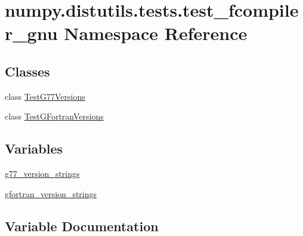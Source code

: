 \hypertarget{namespacenumpy_1_1distutils_1_1tests_1_1test__fcompiler__gnu}{}\section{numpy.\+distutils.\+tests.\+test\+\_\+fcompiler\+\_\+gnu Namespace Reference}
\label{namespacenumpy_1_1distutils_1_1tests_1_1test__fcompiler__gnu}
\subsection*{Classes}
\begin{DoxyCompactItemize}
\item 
class \hyperlink{classnumpy_1_1distutils_1_1tests_1_1test__fcompiler__gnu_1_1TestG77Versions}{Test\+G77\+Versions}
\item 
class \hyperlink{classnumpy_1_1distutils_1_1tests_1_1test__fcompiler__gnu_1_1TestGFortranVersions}{Test\+G\+Fortran\+Versions}
\end{DoxyCompactItemize}
\subsection*{Variables}
\begin{DoxyCompactItemize}
\item 
\hyperlink{namespacenumpy_1_1distutils_1_1tests_1_1test__fcompiler__gnu_a71e6c43345afe2c9904f27861051f51b}{g77\+\_\+version\+\_\+strings}
\item 
\hyperlink{namespacenumpy_1_1distutils_1_1tests_1_1test__fcompiler__gnu_a179eafc5d1f6c955447553370d2707e7}{gfortran\+\_\+version\+\_\+strings}
\end{DoxyCompactItemize}


\subsection{Variable Documentation}
\mbox{\label{namespacenumpy_1_1distutils_1_1tests_1_1test__fcompiler__gnu_a71e6c43345afe2c9904f27861051f51b}} 
